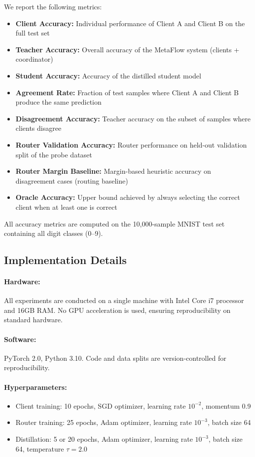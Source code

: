 \documentclass[12pt]{article}
\begin{document}
We report the following metrics:

\begin{itemize}
    \item \textbf{Client Accuracy:} Individual performance of Client A and Client B on the full test set
    \item \textbf{Teacher Accuracy:} Overall accuracy of the MetaFlow system (clients + coordinator)
    \item \textbf{Student Accuracy:} Accuracy of the distilled student model
    \item \textbf{Agreement Rate:} Fraction of test samples where Client A and Client B produce the same prediction
    \item \textbf{Disagreement Accuracy:} Teacher accuracy on the subset of samples where clients disagree
    \item \textbf{Router Validation Accuracy:} Router performance on held-out validation split of the probe dataset
    \item \textbf{Router Margin Baseline:} Margin-based heuristic accuracy on disagreement cases (routing baseline)
    \item \textbf{Oracle Accuracy:} Upper bound achieved by always selecting the correct client when at least one is correct
\end{itemize}

All accuracy metrics are computed on the 10,000-sample MNIST test set containing all digit classes (0--9).

\subsection{Implementation Details}

\paragraph{Hardware:} All experiments are conducted on a single machine with Intel Core i7 processor and 16GB RAM. No GPU acceleration is used, ensuring reproducibility on standard hardware.

\paragraph{Software:} PyTorch 2.0, Python 3.10. Code and data splits are version-controlled for reproducibility.

\paragraph{Hyperparameters:}
\begin{itemize}
    \item Client training: 10 epochs, SGD optimizer, learning rate $10^{-2}$, momentum 0.9
    \item Router training: 25 epochs, Adam optimizer, learning rate $10^{-3}$, batch size 64
    \item Distillation: 5 or 20 epochs, Adam optimizer, learning rate $10^{-3}$, batch size 64, temperature $\tau=2.0$
\end{itemize}
\end{document}
